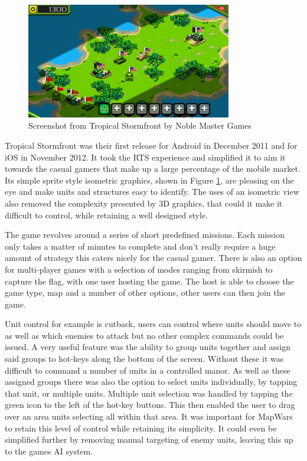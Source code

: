 \begin{figure}
  \centering
   \includegraphics[width=0.8\textwidth]{Images/tropical_storm.png}
  \caption{Screenshot from Tropical Stormfront by Noble Master Games}
  \label{fig:ts}
\end{figure}

Tropical Stormfront was their first release for Android in December 2011 and for iOS in November 2012. It took the RTS experience and simplified it to aim it towards the casual gamers that make up a large percentage of the mobile market. Its simple sprite style isometric graphics, shown in Figure \ref{fig:ts}, are pleasing on the eye and make units and structures easy to identify. The uses of an isometric view also removed the complexity presented by 3D graphics, that could it make it difficult to control, while retaining a well designed style.

The game revolves around a series of short predefined missions. Each mission only takes a matter of minutes to complete and don't really require a huge amount of strategy this caters nicely for the casual gamer. There is also an option for multi-player games with a selection of modes ranging from skirmish to capture the flag, with one user hosting the game. The host is able to choose the game type, map and a number of other options, other users can then join the game.

Unit control for example is cutback, users can control where units should move to as well as which enemies to attack but no other complex commands could be issued. A very useful feature was the ability to group units together and assign said groups to hot-keys along the bottom of the screen. Without these it was difficult to command a number of units in a controlled manor. As well as these assigned groups there was also the option to select units individually, by tapping that unit, or multiple units. Multiple unit selection was handled by tapping the green icon to the left of the hot-key buttons. This then enabled the user to drag over an area units selecting all within that area. It was important for MapWars to retain this level of control while retaining its simplicity. It could even be simplified further by removing manual targeting of enemy units, leaving this up to the games AI system.

